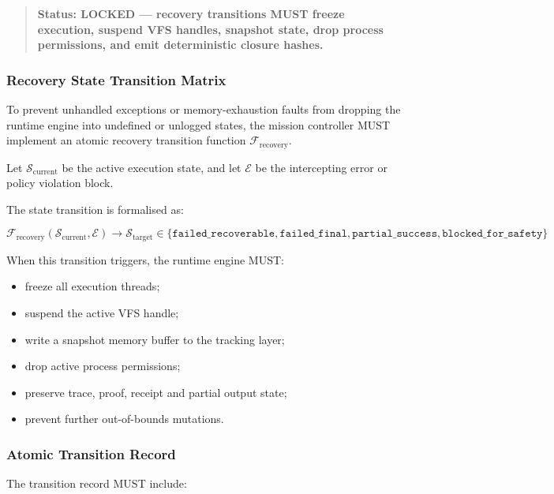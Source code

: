 \begin{quote}
\textbf{Status: LOCKED --- recovery transitions MUST freeze execution, suspend VFS handles, snapshot state, drop process permissions, and emit deterministic closure hashes.}
\end{quote}

\subsubsection{Recovery State Transition Matrix}

To prevent unhandled exceptions or memory-exhaustion faults from dropping the runtime engine into undefined or unlogged states, the mission controller MUST implement an atomic recovery transition function $\mathcal{F}_{\mathrm{recovery}}$.

Let $\mathcal{S}_{\mathrm{current}}$ be the active execution state, and let $\mathcal{E}$ be the intercepting error or policy violation block.

The state transition is formalised as:

\begin{equation}
\mathcal{F}_{\mathrm{recovery}}
(
\mathcal{S}_{\mathrm{current}},
\mathcal{E}
)
\longrightarrow
\mathcal{S}_{\mathrm{target}}
\in
\{
\mathtt{failed\_recoverable},
\mathtt{failed\_final},
\mathtt{partial\_success},
\mathtt{blocked\_for\_safety}
\}
\end{equation}

When this transition triggers, the runtime engine MUST:

\begin{itemize}
  \item freeze all execution threads;
  \item suspend the active VFS handle;
  \item write a snapshot memory buffer to the tracking layer;
  \item drop active process permissions;
  \item preserve trace, proof, receipt and partial output state;
  \item prevent further out-of-bounds mutations.
\end{itemize}

\subsubsection{Atomic Transition Record}

The transition record MUST include:

